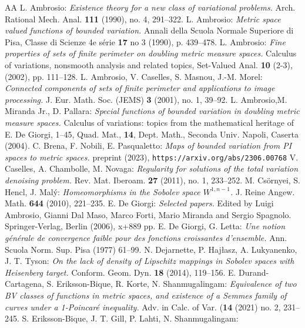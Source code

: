 \documentclass[11pt, letterpaper]{amsart} %
\numberwithin{equation}{section}
\theoremstyle{plain}
\theoremstyle{definition}
\begin{document}
{\begin{thebibliography}{AA}
\frenchspacing
{} L. Ambrosio:
\emph{Existence theory for a new class of variational problems.} 
 Arch. Rational Mech. Anal. {\bf 111} (1990), no. 4, 291--322.
 L. Ambrosio:
\emph{Metric space valued functions of bounded variation.}
Annali della Scuola Normale Superiore di Pisa, Classe di Scienze 4e s\'erie {\bf 17} no 3 (1990), p. 439--478.
 L. Ambrosio: 
\emph{Fine properties of sets of finite perimeter on doubling metric measure spaces.} 
Calculus of variations, nonsmooth analysis and related topics, Set-Valued Anal. \textbf{10} (2-3), (2002), pp. 111--128.
 L. Ambrosio, V. Caselles, S. Masnou, J.-M. Morel:
\emph{Connected components of sets of finite perimeter and applications to image processing.}
J. Eur. Math. Soc. (JEMS) {\bf 3} (2001), no. 1, 39--92.
 L. Ambrosio,M. Miranda Jr., D. Pallara:
\emph{Special functions of bounded variation in doubling metric measure spaces.}
Calculus of variations: topics from the mathematical heritage of E. De Giorgi, 1--45, 
Quad. Mat., {\bf 14}, Dept. Math., Seconda Univ. Napoli, Caserta (2004).
 C. Brena, F. Nobili, E. Pasqualetto:
\emph{Maps of bounded variation from PI spaces to metric spaces.}
preprint (2023), {\tt https://arxiv.org/abs/2306.00768}
 V. Caselles, A. Chambolle, M. Novaga:
\emph{Regularity for solutions of the total variation denoising problem.}
Rev. Mat. Iberoam. {\bf 27} (2011), no. 1, 233--252. 
 M. Cs\"ornyei, S. Hencl, J. Mal\'y:
\emph{Homeomorphisms in the Sobolev space $W^{1,n-1}$.}
J. Reine Angew. Math. {\bf 644} (2010), 221--235. 
 E. De Giorgi:
\emph{Selected papers.}
Edited by Luigi Ambrosio, Gianni Dal Maso, Marco Forti, Mario Miranda and Sergio Spagnolo. 
Springer-Verlag, Berlin (2006), x+889 pp.
 E. De Giorgi, G. Letta: \emph{Une notion générale de convergence faible pour des fonctions croissantes d’ensemble.}
Ann. Scuola Norm. Sup. Pisa (1977) 61–99.
 N. Dejarnette, P. Haj\l asz, A. Lukyanenko, J. T. Tyson:
\emph{On the lack of density of Lipschitz mappings in Sobolev spaces with Heisenberg target.}
Conform. Geom. Dyn. {\bf 18} (2014), 119--156. 
 E. Durand-Cartagena, S. Eriksson-Bique, R. Korte, N. Shanmugalingam: 
\emph{Equivalence of two BV classes of functions in metric spaces, and existence of a 
Semmes family of curves under a 1-Poincaré inequality.}
Adv. in Calc. of Var. ({\bf 14} (2021) no. 2, 231--245.
 S. Eriksson-Bique, J. T. Gill, P. Lahti, N. Shanmugalingam:

\end{thebibliography}}
\end{document}
